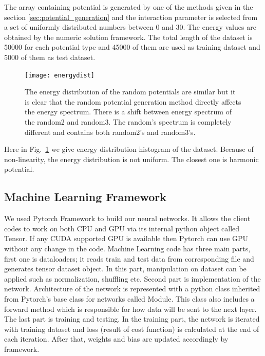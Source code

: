 \documentclass[a4paper,times,hidelinks,12pt]{article}
\begin{document}
The array containing potential is generated by one of the methods given in the section \ref{sec:potential_generation} and the interaction parameter is selected from a set of uniformly distributed numbers between 0 and 30. The energy values are obtained by the numeric solution framework. The total length of the dataset is 50000 for each potential type and 45000 of them are used as training dataset and 5000 of them as test dataset. 

\graphicspath{{"../figs/dataresults/"}}
\begin{figure}[H]
    \centering
    \texttt{[image: energydist]}
\caption{The energy distribution of the random potentials are similar but it is clear that the random potential generation method directly affects the energy spectrum. There is a shift between energy spectrum of the random2 and random3. The random's spectrum is completely different and contains both random2's and random3's.}
\label{fig:energy_dist}
\end{figure}

Here in Fig.~\ref{fig:energy_dist} we give energy distribution histogram of the dataset. Because of non-linearity, the energy distribution is not uniform. The closest one is harmonic potential.


\subsection{Machine Learning Framework}

We used Pytorch Framework \cite{paszke2017automatic} to build our neural networks. It allows the client codes to work on both CPU and GPU via its internal python object called Tensor. If any CUDA supported GPU is available then Pytorch can use GPU without any change in the code. Machine Learning code has three main parts, first one is dataloaders; it reads train and test data from corresponding file and generates tensor dataset object. In this part, manipulation on dataset can be applied such as normalization, shuffling etc. Second part is implementation of the network. Architecture of the network is represented with a python class inherited from Pytorch's base class for networks called Module. This class also includes a forward method which is responsible for how data will be sent to the next layer. The last part is training and testing. In the training part, the network is iterated with training dataset and loss (result of cost function) is calculated at the end of each iteration. After that, weights and bias are updated accordingly by framework.
\end{document}

